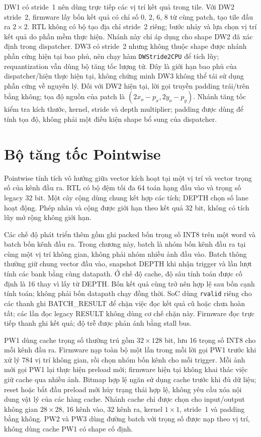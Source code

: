 DW1 có stride~1 nên dùng trực tiếp các vị trí kết quả trong tile. Với DW2 stride~2, firmware lấy bốn kết quả có chỉ số 0, 2, 6, 8 từ cùng patch, tạo tile đầu ra $2\times2$. RTL không có bộ tạo địa chỉ stride~2 riêng; bước nhảy và lựa chọn vị trí kết quả do phần mềm thực hiện. Nhánh này chỉ áp dụng cho shape DW2 đã xác định trong dispatcher. DW3 có stride~2 nhưng không thuộc shape được nhánh phần cứng hiện tại bao phủ, nên chạy hàm \texttt{DWStride2CPU} để tích lũy; requantization vẫn dùng bộ tăng tốc lượng tử. Đây là giới hạn bao phủ của dispatcher/hiện thực hiện tại, không chứng minh DW3 không thể tái sử dụng phần cứng về nguyên lý. Đối với DW2 hiện tại, lời gọi truyền padding trái/trên bằng không; tọa độ nguồn của patch là $(2x_o-p_x,2y_o-p_y)$. Nhánh tăng tốc kiểm tra kích thước, kernel, stride và depth multiplier; padding được dùng để tính tọa độ, không phải một điều kiện shape bổ sung của dispatcher.

\section{Bộ tăng tốc Pointwise}
Pointwise tính tích vô hướng giữa vector kích hoạt tại một vị trí và vector trọng số của kênh đầu ra. RTL có bộ đệm tối đa 64 toán hạng đầu vào và trọng số legacy 32 bit. Một cây cộng dùng chung kết hợp các tích; DEPTH chọn số lane hoạt động. Phép nhân và cộng được giới hạn theo kết quả 32 bit, không có tích lũy mở rộng không giới hạn.

Các chế độ phát triển thêm gồm ghi packed bốn trọng số INT8 trên một word và batch bốn kênh đầu ra. Trong chương này, batch là nhóm bốn kênh đầu ra tại cùng một vị trí không gian, không phải nhóm nhiều ảnh đầu vào. Batch thông thường giữ chung vector đầu vào, snapshot DEPTH khi nhận trigger và lần lượt tính các bank bằng cùng datapath. Ở chế độ cache, độ sâu tính toán được cố định là 16 thay vì lấy từ DEPTH. Bốn kết quả cùng trở nên hợp lệ sau bốn cạnh tính toán; không phải bốn datapath chạy đồng thời. SoC dùng \texttt{rvalid} riêng cho các thanh ghi BATCH\_RESULT để chặn việc đọc kết quả cũ hoặc chưa hoàn tất; các lần đọc legacy RESULT không dùng cơ chế chặn này. Firmware đọc trực tiếp thanh ghi kết quả; độ trễ được phản ánh bằng stall bus.

PW1 dùng cache trọng số thường trú gồm $32\times128$ bit, lưu 16 trọng số INT8 cho mỗi kênh đầu ra. Firmware nạp toàn bộ một lần trong mỗi lời gọi PW1 trước khi xử lý 784 vị trí không gian, rồi chọn nhóm bốn kênh cho mỗi trigger. Mỗi ảnh mới gọi PW1 lại thực hiện preload mới; firmware hiện tại không khai thác việc giữ cache qua nhiều ảnh. Bitmap hợp lệ ngăn sử dụng cache trước khi đủ dữ liệu; reset hoặc bắt đầu preload mới hủy trạng thái hợp lệ, không yêu cầu xóa nội dung vật lý của các hàng cache. Nhánh cache chỉ được chọn cho input/output không gian $28\times28$, 16 kênh vào, 32 kênh ra, kernel $1\times1$, stride~1 và padding bằng không. PW2 và PW3 dùng đường batch với trọng số được nạp theo vị trí, không dùng cache PW1 có shape cố định.

